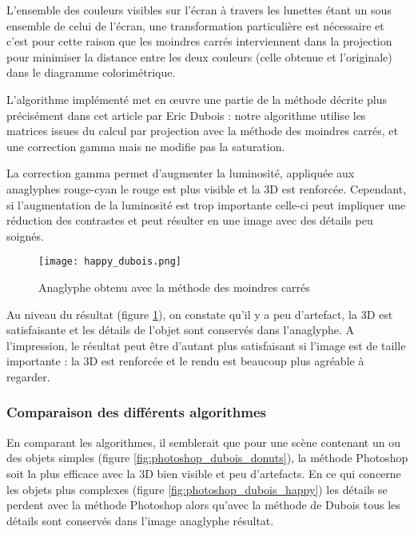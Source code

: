	L'ensemble des couleurs visibles sur l'écran à travers les lunettes étant un sous ensemble de celui de l'écran, une transformation particulière est nécessaire et c'est pour cette raison que les moindres carrés interviennent dans la projection pour minimiser la distance entre les deux couleurs (celle obtenue et l'originale) dans le diagramme colorimétrique.
	
	L'algorithme implémenté met en \oe uvre une partie de la méthode décrite plus précisément dans cet article par Eric Dubois \cite{algoMoindreCarres} : notre algorithme utilise les matrices issues du calcul par projection avec la méthode des moindres carrés, et une correction gamma mais ne modifie pas la saturation.
	
	La correction gamma permet d'augmenter la luminosité, appliquée aux anaglyphes rouge-cyan le rouge est plus visible et la 3D est renforcée. Cependant, si l'augmentation de la luminosité est trop importante celle-ci peut impliquer une réduction des contrastes et peut résulter en une image avec des détails peu soignés.

\begin{figure}[h]
	\centering
	\texttt{[image: happy\_dubois.png]}
	\caption{\label{fig:moindresCarres} Anaglyphe obtenu avec la méthode des moindres carrés \protect}
\end{figure}
	
	Au niveau du résultat (figure \ref{fig:moindresCarres}), on constate qu'il y a peu d'artefact, la 3D est satisfaisante et les détails de l'objet sont conservés dans l'anaglyphe. A l'impression, le résultat peut être d'autant plus satisfaisant si l'image est de taille importante : la 3D est renforcée et le rendu est beaucoup plus agréable à regarder. 
	

\subsubsection{Comparaison des différents algorithmes}

En comparant les algorithmes, il semblerait que pour une scène contenant un ou des objets simples (figure \ref{fig:photoshop_dubois_donuts}), la méthode Photoshop soit la plus efficace avec la 3D bien visible et peu d'artefacts. En ce qui concerne les objets plus complexes (figure \ref{fig:photoshop_dubois_happy}) les détails se perdent avec la méthode Photoshop alors qu'avec la méthode de Dubois tous les détails sont conservés dans l'image anaglyphe résultat. 

